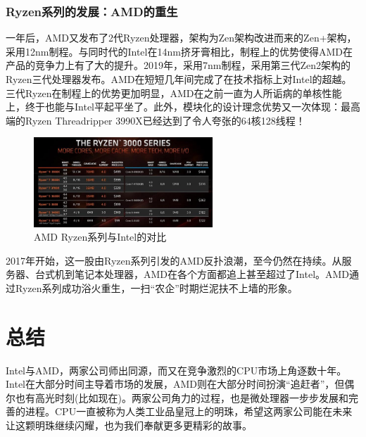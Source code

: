 \documentclass[UTF8]{ctexart}
\begin{document}
\subsubsection{Ryzen系列的发展：AMD的重生}
一年后，AMD又发布了2代Ryzen处理器，架构为Zen架构改进而来的Zen+架构，采用12nm制程。与同时代的Intel在14nm挤牙膏相比，制程上的优势使得AMD在产品的竞争力上有了大的提升。2019年，采用7nm制程，采用第三代Zen2架构的Ryzen三代处理器发布。AMD在短短几年间完成了在技术指标上对Intel的超越。三代Ryzen在制程上的优势更加明显，AMD在之前一直为人所诟病的单核性能上，终于也能与Intel平起平坐了。此外，模块化的设计理念优势又一次体现：最高端的Ryzen Threadripper 3990X已经达到了令人夸张的64核128线程！
\begin{figure}[H]
    \begin{center}
        \includegraphics[width=0.6\textwidth]{figure/ryzen3.jpg}
        \caption{AMD Ryzen系列与Intel的对比}
    \end{center}
\end{figure}
2017年开始，这一股由Ryzen系列引发的AMD反扑浪潮，至今仍然在持续。从服务器、台式机到笔记本处理器，AMD在各个方面都追上甚至超过了Intel。AMD通过Ryzen系列成功浴火重生，一扫“农企”时期烂泥扶不上墙的形象。

\section{总结}

Intel与AMD，两家公司师出同源，而又在竞争激烈的CPU市场上角逐数十年。Intel在大部分时间主导着市场的发展，AMD则在大部分时间扮演“追赶者”，但偶尔也有高光时刻(比如现在)。两家公司角力的过程，也是微处理器一步步发展和完善的进程。CPU一直被称为人类工业品皇冠上的明珠，希望这两家公司能在未来让这颗明珠继续闪耀，也为我们奉献更多更精彩的故事。
\end{document}
